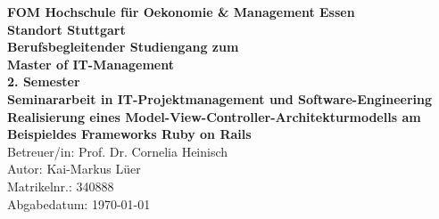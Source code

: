 \noindent
\textbf{FOM Hochschule für Oekonomie \& Management Essen}\\
\textbf{Standort Stuttgart}\\
\linebreak
\linebreak
\textbf{Berufsbegleitender Studiengang zum}\\
\textbf{Master of IT-Management}\\
\linebreak
\linebreak
\textbf{2. Semester}\\
\linebreak
\linebreak
\linebreak
\textbf{Seminararbeit in IT-Projektmanagement und Software-Engineering}\\
\linebreak
\linebreak
\textbf{Realisierung eines Model-View-Controller-Architekturmodells am Beispiel\linebreak des Frameworks Ruby on Rails}\\
\linebreak
\linebreak
Betreuer/in: Prof. Dr. Cornelia Heinisch\\
Autor: Kai-Markus Lüer\\
Matrikelnr.: 340888\\
Abgabedatum: \today
\thispagestyle{empty}